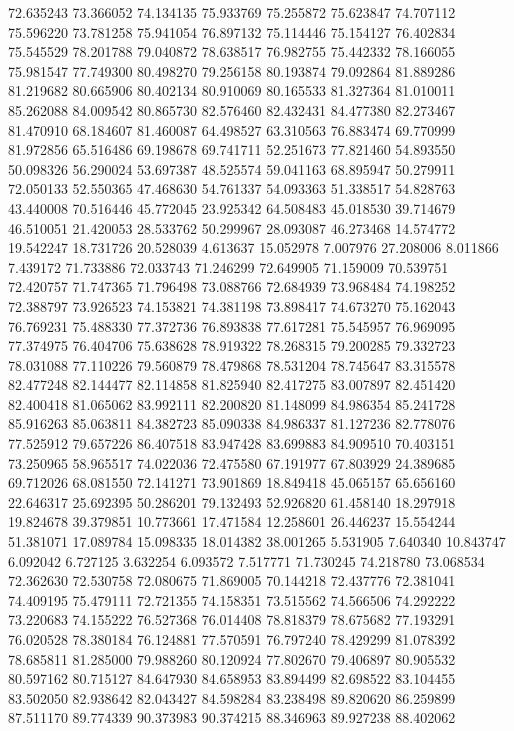 72.635243
73.366052
74.134135
75.933769
75.255872
75.623847
74.707112
75.596220
73.781258
75.941054
76.897132
75.114446
75.154127
76.402834
75.545529
78.201788
79.040872
78.638517
76.982755
75.442332
78.166055
75.981547
77.749300
80.498270
79.256158
80.193874
79.092864
81.889286
81.219682
80.665906
80.402134
80.910069
80.165533
81.327364
81.010011
85.262088
84.009542
80.865730
82.576460
82.432431
84.477380
82.273467
81.470910
68.184607
81.460087
64.498527
63.310563
76.883474
69.770999
81.972856
65.516486
69.198678
69.741711
52.251673
77.821460
54.893550
50.098326
56.290024
53.697387
48.525574
59.041163
68.895947
50.279911
72.050133
52.550365
47.468630
54.761337
54.093363
51.338517
54.828763
43.440008
70.516446
45.772045
23.925342
64.508483
45.018530
39.714679
46.510051
21.420053
28.533762
50.299967
28.093087
46.273468
14.574772
19.542247
18.731726
20.528039
4.613637
15.052978
7.007976
27.208006
8.011866
7.439172
71.733886
72.033743
71.246299
72.649905
71.159009
70.539751
72.420757
71.747365
71.796498
73.088766
72.684939
73.968484
74.198252
72.388797
73.926523
74.153821
74.381198
73.898417
74.673270
75.162043
76.769231
75.488330
77.372736
76.893838
77.617281
75.545957
76.969095
77.374975
76.404706
75.638628
78.919322
78.268315
79.200285
79.332723
78.031088
77.110226
79.560879
78.479868
78.531204
78.745647
83.315578
82.477248
82.144477
82.114858
81.825940
82.417275
83.007897
82.451420
82.400418
81.065062
83.992111
82.200820
81.148099
84.986354
85.241728
85.916263
85.063811
84.382723
85.090338
84.986337
81.127236
82.778076
77.525912
79.657226
86.407518
83.947428
83.699883
84.909510
70.403151
73.250965
58.965517
74.022036
72.475580
67.191977
67.803929
24.389685
69.712026
68.081550
72.141271
73.901869
18.849418
45.065157
65.656160
22.646317
25.692395
50.286201
79.132493
52.926820
61.458140
18.297918
19.824678
39.379851
10.773661
17.471584
12.258601
26.446237
15.554244
51.381071
17.089784
15.098335
18.014382
38.001265
5.531905
7.640340
10.843747
6.092042
6.727125
3.632254
6.093572
7.517771
71.730245
74.218780
73.068534
72.362630
72.530758
72.080675
71.869005
70.144218
72.437776
72.381041
74.409195
75.479111
72.721355
74.158351
73.515562
74.566506
74.292222
73.220683
74.155222
76.527368
76.014408
78.818379
78.675682
77.193291
76.020528
78.380184
76.124881
77.570591
76.797240
78.429299
81.078392
78.685811
81.285000
79.988260
80.120924
77.802670
79.406897
80.905532
80.597162
80.715127
84.647930
84.658953
83.894499
82.698522
83.104455
83.502050
82.938642
82.043427
84.598284
83.238498
89.820620
86.259899
87.511170
89.774339
90.373983
90.374215
88.346963
89.927238
88.402062
